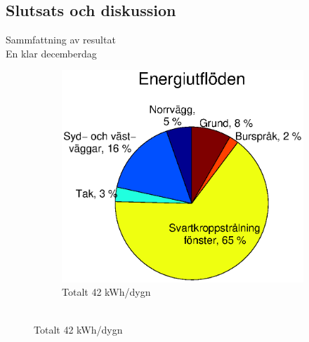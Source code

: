 \subsection{Slutsats och diskussion}

\begin{frame}{Sammfattning av resultat\\En klar decemberdag}


\begin{figure}
        \begin{subfigure}[b]{0.55\textwidth}
                \centering
                \includegraphics[width=\textwidth]{images/totalflow_out.eps}
                \caption*{Totalt 42 kWh/dygn \\ ~}
        \end{subfigure}
        \hskip-1.5cm
\end{figure}
\end{frame}

